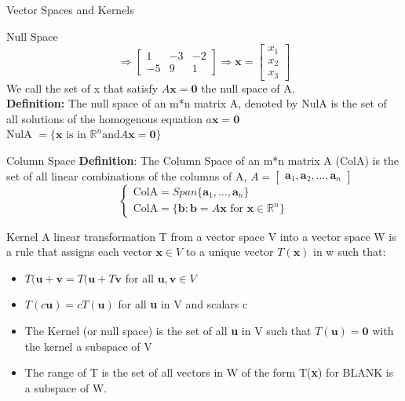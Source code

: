 \documentclass[a4paper, 12pt]{article}
\begin{document}
\begin{section}{Vector Spaces and Kernels}
\begin{subsection}{Null Space}
\begin{equation}
\Rightarrow \begin{bmatrix} 1&-3&-2\\ -5&9&1 \end{bmatrix} 
\Rightarrow
\textbf{x}=\begin{bmatrix} x_1\\ x_2\\ x_3 \end{bmatrix} 
\end{equation}
We call the set of x that satisfy $A\textbf{x}=\textbf{0}$ the 
null space of A.
\\ \noindent\textbf{Definition:} The null space of an m*n matrix A,
denoted by NulA is the set of all solutions of the homogenous equation 
$a\textbf{x}= \textbf{0}$\\
NulA $=\{ \textbf{x} \mbox{ is in } \mathbb{R}^{n} \mbox{and} 
A\textbf{x}=\textbf{0}\}$
\end{subsection}

\begin{subsection}{Column Space}
\noindent \textbf{Definition}: 
The Column Space of an m*n matrix A (ColA) is the set of all linear 
combinations of the columns of A, $A=\begin{bmatrix} 
\textbf{a}_{1}, \textbf{a}_{2},\dots, \textbf{a}_{n} \end{bmatrix}$
\begin{equation}
\begin{cases}
\mbox{ColA}=Span\{\textbf{a}_{1},\dots, \textbf{a}_{n}\} \\
\mbox{ColA} = \{ \textbf{b}: \textbf{b}=A\textbf{x} \mbox{ for } 
	\textbf{x} \in\mathbb{R}^{n}\}
\end{cases}
\end{equation}
\end{subsection}
\begin{subsection}{Kernel}
A linear transformation T from a vector space V into a vector space W
is a rule that assigns each vector $\textbf{x}\in V$ to a unique vector
$T(\textbf{x})$ in w such that:
\begin{itemize}
\item{$T(\textbf{u}+\textbf{v}=T(\textbf{u}+T\textbf{v}$ for all
	$\textbf{u},\textbf{v}\in V$}
\item{$T(c\textbf{u})=cT(\textbf{u})$ for all \textbf{u} in V and 
	scalars c}
\item{The Kernel (or null space) is the set of all \textbf{u} in V such
that $T(\textbf{u})=\textbf{0}$} with the kernel a subspace of V
\item{The range of T is the set of all vectors in W of the form
	T(\textbf{x}) for BLANK is a subspace of W.}
\end{itemize}
\end{subsection}


\end{section}
\end{document}
